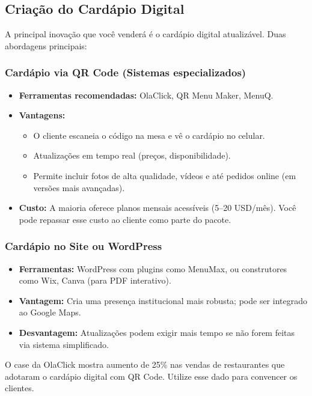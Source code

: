 \documentclass[a4paper,12pt]{article}
\begin{document}
\subsection{Criação do Cardápio Digital}
A principal inovação que você venderá é o cardápio digital atualizável. Duas abordagens principais:

\subsubsection{Cardápio via QR Code (Sistemas especializados)}
\begin{itemize}
    \item \textbf{Ferramentas recomendadas:} OlaClick, QR Menu Maker, MenuQ.
    \item \textbf{Vantagens:}
    \begin{itemize}
        \item O cliente escaneia o código na mesa e vê o cardápio no celular.
        \item Atualizações em tempo real (preços, disponibilidade).
        \item Permite incluir fotos de alta qualidade, vídeos e até pedidos online (em versões mais avançadas).
    \end{itemize}
    \item \textbf{Custo:} A maioria oferece planos mensais acessíveis (5–20 USD/mês). Você pode repassar esse custo ao cliente como parte do pacote.
\end{itemize}

\subsubsection{Cardápio no Site ou WordPress}
\begin{itemize}
    \item \textbf{Ferramentas:} WordPress com plugins como MenuMax, ou construtores como Wix, Canva (para PDF interativo).
    \item \textbf{Vantagem:} Cria uma presença institucional mais robusta; pode ser integrado ao Google Maps.
    \item \textbf{Desvantagem:} Atualizações podem exigir mais tempo se não forem feitas via sistema simplificado.
\end{itemize}

\begin{sucesso}
    O case da OlaClick mostra aumento de 25\% nas vendas de restaurantes que adotaram o cardápio digital com QR Code. Utilize esse dado para convencer os clientes.
\end{sucesso}
\end{document}
